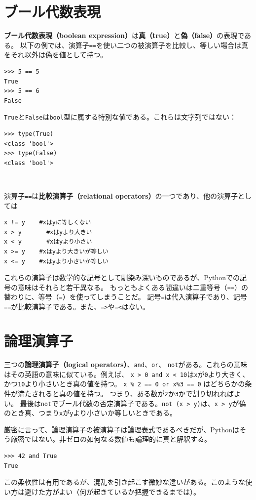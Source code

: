 \documentclass[a4j,12pt,makeidx]{jbook}
\begin{document}
\section{ブール代数表現}
{\bf ブール代数表現（boolean expression）}は{\bf 真（true）}と{\bf 偽（false）}の表現である。
以下の例では、演算子{\tt ==}を使い二つの被演算子を比較し、等しい場合は真をそれ以外は偽を値として持つ。
\begin{verbatim}
>>> 5 == 5
True
>>> 5 == 6
False
\end{verbatim}
{\tt True}と{\tt False}は{\tt bool}型に属する特別な値である。これらは文字列ではない：
\begin{verbatim}
>>> type(True)
<class 'bool'>
>>> type(False)
<class 'bool'>
\end{verbatim}　\par
演算子{\tt ==}は{\bf 比較演算子（relational operators）}の一つであり、他の演算子としては
\begin{verbatim}
x != y    #xはyに等しくない
x > y	    #xはyより大きい
x < y	    #xはyより小さい
x >= y    #xはyより大きいが等しい
x <= y    #xはyより小さいか等しい
\end{verbatim}
これらの演算子は数学的な記号として馴染み深いものであるが、Pythonでの記号の意味はそれらと若干異なる。
もっともよくある間違いは二重等号（{\tt ==}）の替わりに、等号（{\tt =}）を使ってしまうことだ。
記号{\tt =}は代入演算子であり、記号{\tt ==}が比較演算子である。また、{\tt =>}や{\tt =<}はない。
%
\section{論理演算子}
三つの{\bf 論理演算子（logical operators）}、{\tt and}、{\tt  or}、 {\tt not}がある。これらの意味はその英語の意味に似ている。例えば、
{\tt x > 0 and x < 10}は{\tt x}が{\tt 0}より大きく、かつ{\tt 10}より小さいとき真の値を持つ。
{\verb"x % 2 == 0 or x%3 == 0"}
はどちらかの条件が満たされると真の値を持つ。
つまり、ある数が{\tt 2}か{\tt 3}かで割り切れればよい。
最後は{\tt not}でブール代数の否定演算子である。{\tt not (x > y)}は、{\tt x > y}が偽のとき真、つまり{\tt x}が{\tt y}より小さいか等しいときである。\par
厳密に言って、論理演算子の被演算子は論理表式であるべきだが、Pythonはそう厳密ではない。非ゼロの如何なる数値も論理的に真と解釈する。
\begin{verbatim}
>>> 42 and True
True
\end{verbatim}
この柔軟性は有用であるが、混乱を引き起こす微妙な違いがある。このような使い方は避けた方がよい（何が起きているか把握できるまでは）。
%
\end{document}
